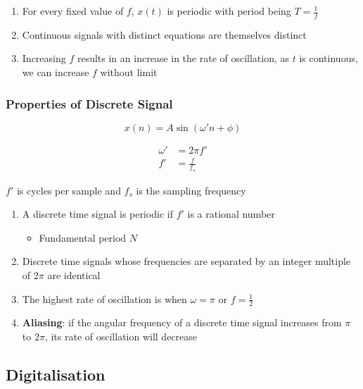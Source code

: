       \begin{enumerate}
        \item For every fixed value of $ f $, $ x\left( t \right) $ is periodic
        with period being $ T = \frac{1}{f} $
        \item Continuous signals with distinct equations are themselves distinct
        \item Increasing $ f $ results in an increase in the rate of oscillation,
        as $ t $ is continuous, we can increase $ f $ without limit
      \end{enumerate}

    \subsubsection{Properties of Discrete Signal}

      \begin{equation*}
        x\left( n \right) = A \sin\left( \omega' n + \phi \right)
      \end{equation*}

      \begin{align}
        \omega' &= 2\pi f' \\
        f' &= \frac{f}{f_{s}}
      \end{align}

      $ f' $ is cycles per sample and $ f_{s} $ is the sampling frequency

      \begin{enumerate}
        \item A discrete time signal is periodic if $ f' $ is a rational number
        \begin{itemize}
          \item Fundamental period $ N $
        \end{itemize}

        \item Discrete time signals whose frequencies are separated by an
        integer multiple of $ 2 \pi $ are identical
        \item The highest rate of oscillation is when $ \omega = \pi $ or
        $ f = \frac{1}{2} $
        \item \textbf{Aliasing}: if the angular frequency of a discrete time
        signal increases from $ \pi $ to $ 2\pi $, its rate of oscillation
        will decrease
      \end{enumerate}

  \subsection{Digitalisation}

